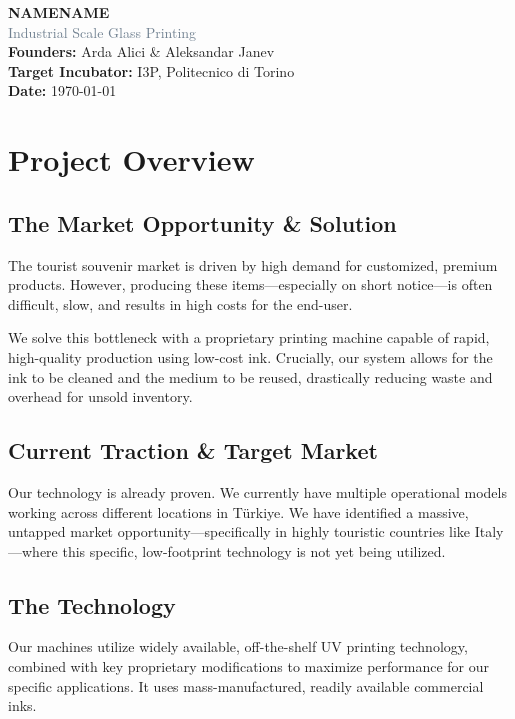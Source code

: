 \documentclass[11pt, a4paper]{article}
\begin{document}
\begin{flushleft}
	{\Huge \textbf{\textcolor{TechBlue}{NAMENAME}}} \\[0.3cm]
	{\Large \textcolor{SlateGray}{Industrial Scale Glass Printing}} \\[0.5cm]
	\textbf{Founders:} Arda Alici \& Aleksandar Janev \\
	\textbf{Target Incubator:} I3P, Politecnico di Torino \\
	\textbf{Date:} \today
\end{flushleft}
\vspace{0.8cm}

\section*{Project Overview}

\subsection*{The Market Opportunity \& Solution}
The tourist souvenir market is driven by high demand for customized,
premium products. However, producing these items—especially on short
notice—is often difficult, slow, and results in high costs for the end-user.

We solve this bottleneck with a proprietary printing machine capable
of rapid, high-quality production using low-cost ink. Crucially, our
system allows for the ink to be cleaned and the medium to be reused,
drastically reducing waste and overhead for unsold inventory.

\subsection*{Current Traction \& Target Market}
Our technology is already proven. We currently have multiple
operational models working across different locations in Türkiye. We
have identified a massive, untapped market opportunity—specifically
in highly touristic countries like Italy—where this specific,
low-footprint technology is not yet being utilized.

\subsection*{The Technology}
Our machines utilize widely available, off-the-shelf UV printing
technology, combined with key proprietary modifications to maximize
performance for our specific applications. It uses mass-manufactured,
readily available commercial inks.
\end{document}
